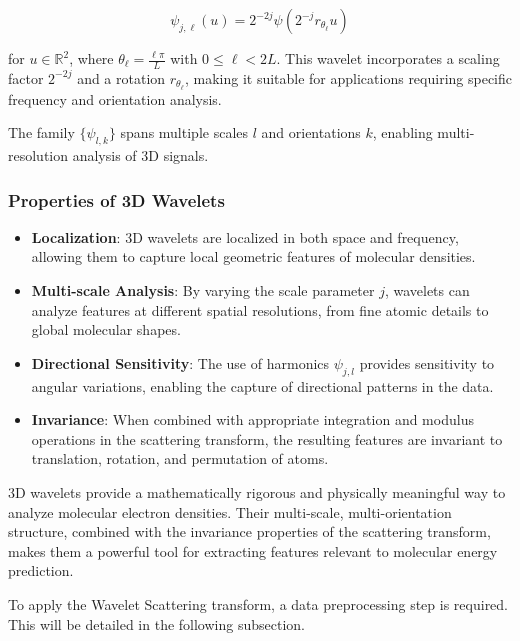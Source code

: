\documentclass{article}
\begin{document}
\[
\psi_{j,\ell}(u) = 2^{-2j} \psi(2^{-j} r_{\theta_\ell} u)
\]

for \( u \in \mathbb{R}^2 \), where \(\theta_\ell = \frac{\ell \pi}{L}\) with \( 0 \leq \ell < 2L \). This wavelet incorporates a scaling factor \( 2^{-2j} \) and a rotation \( r_{\theta_\ell} \), making it suitable for applications requiring specific frequency and orientation analysis. \newline




The family $\{\psi_{l,k}\}$ spans multiple scales $l$ and orientations $k$, enabling multi-resolution analysis of 3D signals.

\subsubsection{Properties of 3D Wavelets}

\begin{itemize}
  \item \textbf{Localization}: 3D wavelets are localized in both space and frequency, allowing them to capture local geometric features of molecular densities.
  \item \textbf{Multi-scale Analysis}: By varying the scale parameter $j$, wavelets can analyze features at different spatial resolutions, from fine atomic details to global molecular shapes.
  \item \textbf{Directional Sensitivity}: The use of harmonics $\psi_{j,l}$ provides sensitivity to angular variations, enabling the capture of directional patterns in the data.
  \item \textbf{Invariance}: When combined with appropriate integration and modulus operations in the scattering transform, the resulting features are invariant to translation, rotation, and permutation of atoms. \newline
\end{itemize}







3D wavelets provide a mathematically rigorous and physically meaningful way to analyze molecular electron densities. Their multi-scale, multi-orientation structure, combined with the invariance properties of the scattering transform, makes them a powerful tool for extracting features relevant to molecular energy prediction. \newline


To apply the Wavelet Scattering transform, a data preprocessing step is required. This will be detailed in the following subsection.
\end{document}
